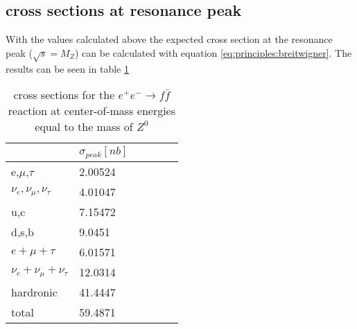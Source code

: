 \subsection{cross sections at resonance peak}
With the values calculated above the expected cross section at the resonance peak ($\sqrt{s}=M_Z$) can be calculated with equation \ref{eq:principles:breitwigner}.
The results can be seen in table \ref{tb:appendix:cross sections}
\begin{table}[H]\centering
	\begin{tabular}{@{}llllll@{}}
		\toprule
		& $\sigma_{peak}[nb]$\\
		\midrule
		e,$\mu $,$\tau $ & 2.00524 \\
		$\nu _e,\nu _{\mu },\nu _{\tau }$ & 4.01047 \\
		u,c & 7.15472 \\
		d,s,b & 9.0451 \\
		$e+\mu+\tau$ & 6.01571\\
		$\nu _e+\nu _{\mu }+\nu _{\tau }$ & 12.0314\\
		hardronic & 41.4447 \\
		total & 59.4871 \\
		\bottomrule
	\end{tabular}
	\caption[$e^+ e^- \rightarrow f \bar{f}$ cross sections]{cross sections for the $e^+ e^- \rightarrow f \bar{f}$ reaction at center-of-mass energies equal to the mass of $Z^0$}
	\label{tb:appendix:cross sections}
\end{table}
